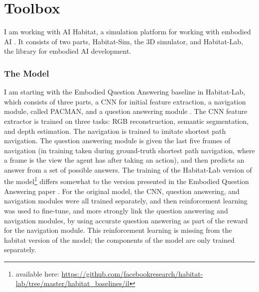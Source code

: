\chapter{Toolbox}
I am working with AI Habitat, a simulation platform for working with embodied AI \cite{habitat19iccv}. It consists of two parts, Habitat-Sim, the 3D simulator, and Habitat-Lab, the library for embodied AI development. 

\subsection{The Model}
\label{subsection:model}
I am starting with the Embodied Question Answering baseline in Habitat-Lab, which consists of three parts, a CNN for initial feature extraction, a navigation module, called PACMAN, and a question answering module \cite{embodiedqa}.
The CNN feature extractor is trained on three tasks: RGB reconstruction, semantic segmentation, and depth estimation.
The navigation is trained to imitate shortest path navigation. %
The question answering module is given the last five frames of navigation (in training taken during ground-truth shortest path navigation, where a frame is the view the agent has after taking an action), and then predicts an answer from a set of possible answers. 
The training of the Habitat-Lab version of the model\footnote{available here: \url{https://github.com/facebookresearch/habitat-lab/tree/master/habitat_baselines/il}} differs somewhat to the version presented in the Embodied Question Answering paper \cite{embodiedqa}. For the original model, the CNN, question answering, and navigation modules were all trained separately, and then reinforcement learning was used to fine-tune, and more strongly link the question answering and navigation modules, by using accurate question answering %
as part of the reward for the navigation module. This reinforcement learning is missing from the habitat version of the model; the components of the model are only trained separately. 

